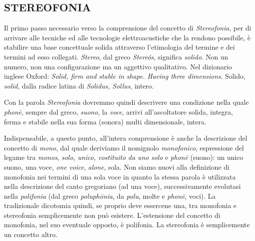 \begin{refsection}

\chapter{STEREOFONIA}
\startcontents[chapters]

\vfill\null

Il primo passo necessario verso la comprensione del concetto di \emph{Stereofonia},
per di arrivare alle tecniche ed alle tecnologie elettroacustiche che la
rendono possibile, è stabilire una base concettuale solida attraverso
l'etimologia del termine e dei termini ad esso collegati. \emph{Stereo}, dal greco
\emph{Stere\'os}, significa \emph{solido}. Non un numero, non una configurazione
ma un aggettivo qualitativo. Nel dizionario inglese Oxford: \emph{Solid, firm
and stable in shape. Having three dimensions}. Solido, \emph{solid}, dalla radice
latina di \emph{Solidus, Sollus}, intero.

Con la parola \emph{Stereofonia} dovremmo quindi descrivere una condizione
nella quale \emph{phon\={e}}, sempre dal greco, \emph{suono}, la \emph{voce},
arrivi all'ascoltatore solida, integra, ferma e stabile nella sua forma (sonora)
multi dimensionale, intera.


Indispensabile, a questo punto, all'intera comprensione è anche la descrizione
del concetto di \emph{mono}, dal quale deriviamo il nomignolo \emph{monofonico},
espressione del legame tra \emph{monos}, \emph{solo, unico, costituito da uno solo}
e \emph{phon\={e}} (suono): un unico suono, una voce, \emph{one voice},
\emph{alone}, sola. Non siamo nuovi alla definizione di monofonia nei termini di
una sola voce in quanto la stessa parola è utilizzata nella descrizione
del canto gregoriano (ad una voce), successivamente evolutasi nella \emph{polifonia}
(dal greco \emph{poluph\={o}nia}, da \emph{polu}, molte e \emph{phon\={e}},
voci). La tradizionale dicotomia quindi, se proprio deve essercene una, tra
monofonia e stereofonia semplicemente non può esistere. L'estensione del concetto
di monofonia, nel suo eventuale opposto, è polifonia. La stereofonia è semplicemente un
concetto altro.


\end{refsection}
